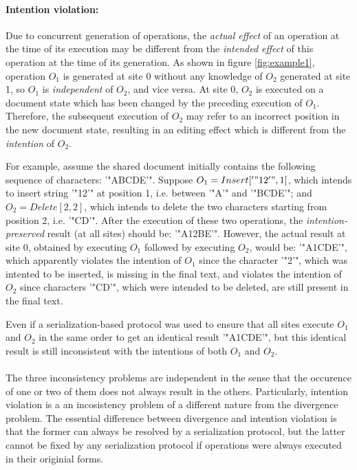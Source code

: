 \documentclass[11pt,a4paper]{article}
\begin{document}
\paragraph{Intention violation:}
Due to concurrent generation of operations, the \emph{actual effect} of an operation at the time of its execution may be different from the \emph{intended effect} of this operation at the time of its generation. As shown in figure \ref{fig:example1}, operation $O_{1}$ is generated at site 0 without any knowledge of $O_{2}$ generated at site 1, so $O_{1}$ is \emph{independent} of $O_{2}$, and vice versa. At site 0, $O_{2}$ is executed on a document state which has been changed by the preceding execution of $O_{1}$. Therefore, the subsequent execution of $O_{2}$ may refer to an incorrect position in the new document state, resulting in an editing effect which is different from the \emph{intention} of $O_{2}$. 

For example, assume the shared document initially contains the following sequence of characters: '"ABCDE'". Suppose $O_{1}=Insert['"12'",1]$, which intends to insert string '"12'" at position 1, i.e. between '"A'" and '"BCDE'"; and $O_{2}=Delete[2,2]$, which intends to delete the two characters starting from position 2, i.e. '"CD'". After the execution of these two operations, the \emph{intention-preserved} result (at all sites) should be: '"A12BE'". However, the actual result at site 0, obtained by executing $O_{1}$ followed by executing $O_{2}$, would be: '"A1CDE'", which apparently violates the intention of $O_{1}$ since the character '"2'", which was intented to be inserted, is missing in the final text, and violates the intention of $O_{2}$ since characters '"CD'", which were intended to be deleted, are still present in the final text.

Even if a serialization-based protocol was used to ensure that all sites execute $O_{1}$ and $O_{2}$ in the same order to get an identical result '"A1CDE'", but this identical result is still inconsistent with the intentions of both $O_{1}$ and $O_{2}$.

\paragraph{} 
The three inconsistency problems are independent in the sense that the occurence of one or two of them does not always result in the others. Particularly, intention violation is a an incosistency problem of a different nature from the divergence problem. The essential difference between divergence and intention violation is that the former can always be resolved by a serialization protocol, but the latter cannot be fixed by any serialization protocol if operations were always executed in their originial forms.
\end{document}
